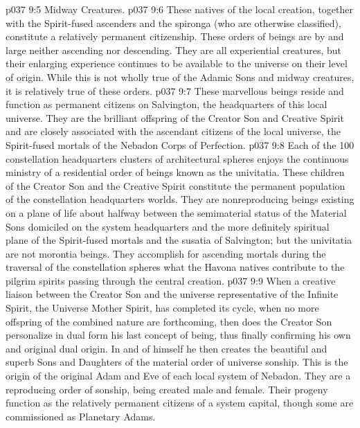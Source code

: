 \vs p037 9:5 \bibnobreakspace Midway Creatures.
\vs p037 9:6 \pc These natives of the local creation, together with the Spirit\hyp{}fused ascenders and the spironga (who are otherwise classified), constitute a relatively permanent citizenship. These orders of beings are by and large neither ascending nor descending. They are all experiential creatures, but their enlarging experience continues to be available to the universe on their level of origin. While this is not wholly true of the Adamic Sons and midway creatures, it is relatively true of these orders.
\vs p037 9:7 \pc {} These marvellous beings reside and function as permanent citizens on Salvington, the headquarters of this local universe. They are the brilliant offspring of the Creator Son and Creative Spirit and are closely associated with the ascendant citizens of the local universe, the Spirit\hyp{}fused mortals of the Nebadon Corps of Perfection.
\vs p037 9:8 \pc {} Each of the 100 constellation headquarters clusters of architectural spheres enjoys the continuous ministry of a residential order of beings known as the univitatia. These children of the Creator Son and the Creative Spirit constitute the permanent population of the constellation headquarters worlds. They are nonreproducing beings existing on a plane of life about halfway between the semimaterial status of the Material Sons domiciled on the system headquarters and the more definitely spiritual plane of the Spirit\hyp{}fused mortals and the susatia of Salvington; but the univitatia are not morontia beings. They accomplish for ascending mortals during the traversal of the constellation spheres what the Havona natives contribute to the pilgrim spirits passing through the central creation.
\vs p037 9:9 \pc {} When a creative liaison between the Creator Son and the universe representative of the Infinite Spirit, the Universe Mother Spirit, has completed its cycle, when no more offspring of the combined nature are forthcoming, then does the Creator Son personalize in dual form his last concept of being, thus finally confirming his own and original dual origin. In and of himself he then creates the beautiful and superb Sons and Daughters of the material order of universe sonship. This is the origin of the original Adam and Eve of each local system of Nebadon. They are a reproducing order of sonship, being created male and female. Their progeny function as the relatively permanent citizens of a system capital, though some are commissioned as Planetary Adams.
